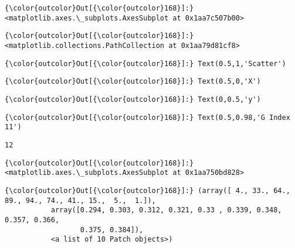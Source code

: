 \documentclass[11pt]{article}
\begin{document}
\begin{Verbatim}[commandchars=\\\{\}]
{\color{outcolor}Out[{\color{outcolor}168}]:} <matplotlib.axes.\_subplots.AxesSubplot at 0x1aa7c507b00>
\end{Verbatim}
            
\begin{Verbatim}[commandchars=\\\{\}]
{\color{outcolor}Out[{\color{outcolor}168}]:} <matplotlib.collections.PathCollection at 0x1aa79d81cf8>
\end{Verbatim}
            
\begin{Verbatim}[commandchars=\\\{\}]
{\color{outcolor}Out[{\color{outcolor}168}]:} Text(0.5,1,'Scatter')
\end{Verbatim}
            
\begin{Verbatim}[commandchars=\\\{\}]
{\color{outcolor}Out[{\color{outcolor}168}]:} Text(0.5,0,'X')
\end{Verbatim}
            
\begin{Verbatim}[commandchars=\\\{\}]
{\color{outcolor}Out[{\color{outcolor}168}]:} Text(0,0.5,'y')
\end{Verbatim}
            
\begin{Verbatim}[commandchars=\\\{\}]
{\color{outcolor}Out[{\color{outcolor}168}]:} Text(0.5,0.98,'G Index 11')
\end{Verbatim}
            
    \begin{Verbatim}[commandchars=\\\{\}]
12

    \end{Verbatim}

\begin{Verbatim}[commandchars=\\\{\}]
{\color{outcolor}Out[{\color{outcolor}168}]:} <matplotlib.axes.\_subplots.AxesSubplot at 0x1aa750bd828>
\end{Verbatim}
            
\begin{Verbatim}[commandchars=\\\{\}]
{\color{outcolor}Out[{\color{outcolor}168}]:} (array([ 4., 33., 64., 89., 94., 74., 41., 15.,  5.,  1.]),
           array([0.294, 0.303, 0.312, 0.321, 0.33 , 0.339, 0.348, 0.357, 0.366,
                  0.375, 0.384]),
           <a list of 10 Patch objects>)
\end{Verbatim}
            
\end{document}
